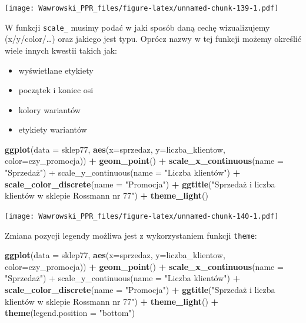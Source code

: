 \documentclass[]{book}
\newenvironment{Shaded}{\begin{snugshade}}{\end{snugshade}}
\newcommand{\KeywordTok}[1]{\textcolor[rgb]{0.13,0.29,0.53}{\textbf{#1}}}
\newcommand{\DataTypeTok}[1]{\textcolor[rgb]{0.13,0.29,0.53}{#1}}
\newcommand{\StringTok}[1]{\textcolor[rgb]{0.31,0.60,0.02}{#1}}
\newcommand{\OperatorTok}[1]{\textcolor[rgb]{0.81,0.36,0.00}{\textbf{#1}}}
\newcommand{\NormalTok}[1]{#1}
\providecommand{\tightlist}{%
  \setlength{\itemsep}{0pt}\setlength{\parskip}{0pt}}
\begin{document}
\texttt{[image: Wawrowski\_PPR\_files/figure-latex/unnamed-chunk-139-1.pdf]}

W funkcji \texttt{scale\_} musimy podać w jaki sposób daną cechę
wizualizujemy (x/y/color/\ldots{}) oraz jakiego jest typu. Oprócz nazwy
w tej funkcji możemy określić wiele innych kwestii takich jak:

\begin{itemize}
\tightlist
\item
  wyświetlane etykiety
\item
  początek i koniec osi
\item
  kolory wariantów
\item
  etykiety wariantów
\end{itemize}

\begin{Shaded}
\begin{Highlighting}[]
\KeywordTok{ggplot}\NormalTok{(}\DataTypeTok{data =}\NormalTok{ sklep77, }\KeywordTok{aes}\NormalTok{(}\DataTypeTok{x=}\NormalTok{sprzedaz, }\DataTypeTok{y=}\NormalTok{liczba_klientow, }\DataTypeTok{color=}\NormalTok{czy_promocja)) }\OperatorTok{+}
\StringTok{  }\KeywordTok{geom_point}\NormalTok{() }\OperatorTok{+}
\StringTok{  }\KeywordTok{scale_x_continuous}\NormalTok{(}\DataTypeTok{name =} \StringTok{"Sprzedaż") +}
\StringTok{  scale_y_continuous(name = "}\NormalTok{Liczba klientów") }\OperatorTok{+}
\StringTok{  }\KeywordTok{scale_color_discrete}\NormalTok{(}\DataTypeTok{name =} \StringTok{"Promocja"}\NormalTok{) }\OperatorTok{+}
\StringTok{  }\KeywordTok{ggtitle}\NormalTok{(}\StringTok{"Sprzedaż i liczba klientów w sklepie Rossmann nr 77"}\NormalTok{) }\OperatorTok{+}
\StringTok{  }\KeywordTok{theme_light}\NormalTok{()}
\end{Highlighting}
\end{Shaded}

\texttt{[image: Wawrowski\_PPR\_files/figure-latex/unnamed-chunk-140-1.pdf]}

Zmiana pozycji legendy możliwa jest z wykorzystaniem funkcji
\texttt{theme}:

\begin{Shaded}
\begin{Highlighting}[]
\KeywordTok{ggplot}\NormalTok{(}\DataTypeTok{data =}\NormalTok{ sklep77, }\KeywordTok{aes}\NormalTok{(}\DataTypeTok{x=}\NormalTok{sprzedaz, }\DataTypeTok{y=}\NormalTok{liczba_klientow, }\DataTypeTok{color=}\NormalTok{czy_promocja)) }\OperatorTok{+}
\StringTok{  }\KeywordTok{geom_point}\NormalTok{() }\OperatorTok{+}
\StringTok{  }\KeywordTok{scale_x_continuous}\NormalTok{(}\DataTypeTok{name =} \StringTok{"Sprzedaż") +}
\StringTok{  scale_y_continuous(name = "}\NormalTok{Liczba klientów") }\OperatorTok{+}
\StringTok{  }\KeywordTok{scale_color_discrete}\NormalTok{(}\DataTypeTok{name =} \StringTok{"Promocja"}\NormalTok{) }\OperatorTok{+}
\StringTok{  }\KeywordTok{ggtitle}\NormalTok{(}\StringTok{"Sprzedaż i liczba klientów w sklepie Rossmann nr 77"}\NormalTok{) }\OperatorTok{+}
\StringTok{  }\KeywordTok{theme_light}\NormalTok{() }\OperatorTok{+}
\StringTok{  }\KeywordTok{theme}\NormalTok{(}\DataTypeTok{legend.position =} \StringTok{"bottom"}\NormalTok{)}
\end{Highlighting}
\end{Shaded}
\end{document}
